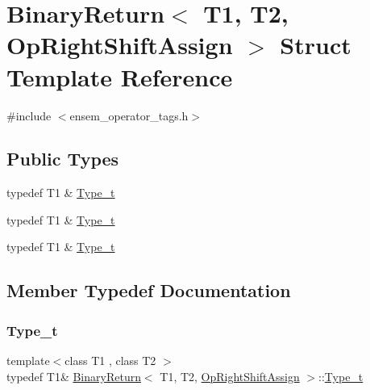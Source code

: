 \hypertarget{structBinaryReturn_3_01T1_00_01T2_00_01OpRightShiftAssign_01_4}{}\section{Binary\+Return$<$ T1, T2, Op\+Right\+Shift\+Assign $>$ Struct Template Reference}
\label{structBinaryReturn_3_01T1_00_01T2_00_01OpRightShiftAssign_01_4}


{\ttfamily \#include $<$ensem\+\_\+operator\+\_\+tags.\+h$>$}

\subsection*{Public Types}
\begin{DoxyCompactItemize}
\item 
typedef T1 \& \mbox{\hyperlink{structBinaryReturn_3_01T1_00_01T2_00_01OpRightShiftAssign_01_4_a4f80fa9e1ec9a2dfe91aa4777336c606}{Type\+\_\+t}}
\item 
typedef T1 \& \mbox{\hyperlink{structBinaryReturn_3_01T1_00_01T2_00_01OpRightShiftAssign_01_4_a4f80fa9e1ec9a2dfe91aa4777336c606}{Type\+\_\+t}}
\item 
typedef T1 \& \mbox{\hyperlink{structBinaryReturn_3_01T1_00_01T2_00_01OpRightShiftAssign_01_4_a4f80fa9e1ec9a2dfe91aa4777336c606}{Type\+\_\+t}}
\end{DoxyCompactItemize}


\subsection{Member Typedef Documentation}
\mbox{\label{structBinaryReturn_3_01T1_00_01T2_00_01OpRightShiftAssign_01_4_a4f80fa9e1ec9a2dfe91aa4777336c606}} 
\subsubsection{\texorpdfstring{Type\_t}{Type\_t}\hspace{0.1cm}{\footnotesize\ttfamily [1/3]}}
{\footnotesize\ttfamily template$<$class T1 , class T2 $>$ \\
typedef T1\& \mbox{\hyperlink{structBinaryReturn}{Binary\+Return}}$<$ T1, T2, \mbox{\hyperlink{structOpRightShiftAssign}{Op\+Right\+Shift\+Assign}} $>$\+::\mbox{\hyperlink{structBinaryReturn_3_01T1_00_01T2_00_01OpRightShiftAssign_01_4_a4f80fa9e1ec9a2dfe91aa4777336c606}{Type\+\_\+t}}}

